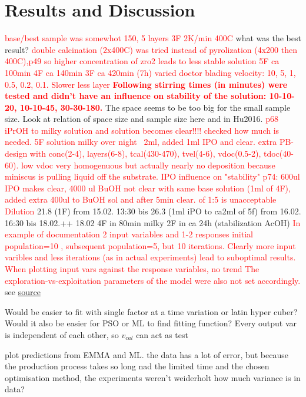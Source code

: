 \documentclass[a4paper]{article}
\newcommand{\todo}[1]{\textbf{\textcolor{red}{#1}}}
\newcommand{\td}[1]{\textcolor{red}{#1}}
\begin{document}
\section{Results and Discussion}
\td{base/best sample was somewhot 150, 5 layers 3F 2K/min 400C} what was the best result?
\td{
double calcination (2x400C) was tried instead of pyrolization (4x200 then 400C),p49
so higher concentration of zro2 leads to less stable solution
5F ca 100min
4F ca 140min
3F ca 420min (7h)
}
\td{varied doctor blading velocity: 10, 5, 1, 0.5, 0.2, 0.1. Slower less layer}
\todo{Following stirring times (in minutes) were tested and didn't have an influence on stability of the solution: 10-10-20, 10-10-45, 30-30-180.}
The space seems to be too big for the small sample size.
Look at relation of space size and sample size here and in Hu2016.
\td{p68 iPrOH to milky solution and solution becomes clear!!!! checked how much 
is needed. 5F solution milky over night ~2ml, added 1ml IPO and clear.}
\td{extra PB-design with conc(2-4), layers(6-8), tcal(430-470), tvel(4-6),
vdoc(0.5-2), tdoc(40-60). low vdoc very homogenuous but actually nearly no 
deposition because miniscus is pulling liquid off the substrate.}
\td{IPO influence on "stability" p74: 600ul IPO makes clear, 4000 ul BuOH not clear with 
same base solution (1ml of 4F), added extra 400ul to BuOH sol and after 5min clear. 
of 1:5 is unacceptable Dilution }
21.8 (1F) from 15.02. 13:30 bis 
26.3 (1ml iPO to ca2ml of 5f) from 16.02. 16:30 bis 18.02.++
18.02 4F in 80min milky
      2F in ca 24h (stabilization AcOH)
\td{In example of documentation 2 input variables and 1-2 responses initial population=10
, subsequent population=5, but 10 iterations. Clearly more input varibles and less 
iterations (as in actual experiments) lead to suboptimal results.
When plotting input vars  against the response variables, no trend
The exploration-vs-exploitation parameters of the model were also not set accordingly.}
see \href{https://search.r-project.org/CRAN/refmans/emma/html/emma.html}{source}


Would be easier to fit with single factor at a time variation or latin hyper cuber?
Would it also be easier for PSO or ML to find fitting function?
Every output var is independent of each other, so $v_{cal}$ can act as test 

plot predictions from EMMA and ML.
the data has a lot of error, but because the production process takes so long nad the limited time and the chosen optimisation method, the experiments weren't weiderholt
how much variance is in data? 
\end{document}
